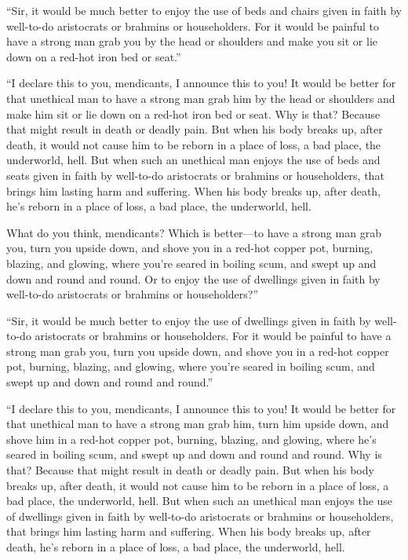 \documentclass[12pt,openany]{book}%
\begin{document}
“Sir, it would be much better to enjoy the use of beds and chairs given in faith by well-to-do aristocrats or brahmins or householders. For it would be painful to have a strong man grab you by the head or shoulders and make you sit or lie down on a red-hot iron bed or seat.” 

“I declare this to you, mendicants, I announce this to you! It would be better for that unethical man to have a strong man grab him by the head or shoulders and make him sit or lie down on a red-hot iron bed or seat. Why is that? Because that might result in death or deadly pain. But when his body breaks up, after death, it would not cause him to be reborn in a place of loss, a bad place, the underworld, hell. But when such an unethical man enjoys the use of beds and seats given in faith by well-to-do aristocrats or brahmins or householders, that brings him lasting harm and suffering. When his body breaks up, after death, he’s reborn in a place of loss, a bad place, the underworld, hell. 

What do you think, mendicants? Which is better—to have a strong man grab you, turn you upside down, and shove you in a red-hot copper pot, burning, blazing, and glowing, where you’re seared in boiling scum, and swept up and down and round and round. Or to enjoy the use of dwellings given in faith by well-to-do aristocrats or brahmins or householders?” 

“Sir, it would be much better to enjoy the use of dwellings given in faith by well-to-do aristocrats or brahmins or householders. For it would be painful to have a strong man grab you, turn you upside down, and shove you in a red-hot copper pot, burning, blazing, and glowing, where you’re seared in boiling scum, and swept up and down and round and round.” 

“I declare this to you, mendicants, I announce this to you! It would be better for that unethical man to have a strong man grab him, turn him upside down, and shove him in a red-hot copper pot, burning, blazing, and glowing, where he’s seared in boiling scum, and swept up and down and round and round. Why is that? Because that might result in death or deadly pain. But when his body breaks up, after death, it would not cause him to be reborn in a place of loss, a bad place, the underworld, hell. But when such an unethical man enjoys the use of dwellings given in faith by well-to-do aristocrats or brahmins or householders, that brings him lasting harm and suffering. When his body breaks up, after death, he’s reborn in a place of loss, a bad place, the underworld, hell. 
\end{document}
